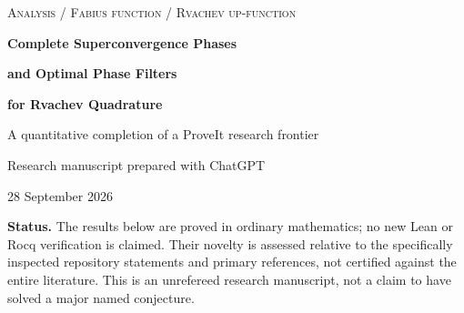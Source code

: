 \documentclass[11pt,a4paper]{article}
\numberwithin{equation}{section}
\theoremstyle{plain}
\theoremstyle{definition}
\theoremstyle{remark}
\begin{document}
\hypersetup{pageanchor=false}
\begin{titlepage}
\centering
\vspace*{12mm}
{\small\scshape Analysis / Fabius function / Rvachev up-function\par}
\vspace{13mm}
{\LARGE\bfseries Complete Superconvergence Phases\par}
\vspace{3mm}
{\LARGE\bfseries and Optimal Phase Filters\par}
\vspace{3mm}
{\LARGE\bfseries for Rvachev Quadrature\par}
\vspace{9mm}
{\large A quantitative completion of a ProveIt research frontier\par}
\vspace{10mm}
{Research manuscript prepared with ChatGPT\par}
{28 September 2026\par}
\vspace{12mm}
\begin{minipage}{0.92\textwidth}
\begin{abstract}
The ProveIt Fabius-function project establishes polynomial quadrature
exactness at parity-selected lattice phases, while explicitly leaving open
whether other first-superconvergent phases exist. We prove that they do not.
For every positive integer mesh parameter $M$, write $d=\nu_2(M)$.
Exactly two phases modulo one integrate all polynomials through degree
$d+1$: $0,\tfrac12$ when $d$ is even, and $\tfrac14,\tfrac34$ when $d$ is odd.
The proof is quantitative. An odd-multiplier inequality for the Fourier
product makes the entire first defect a relative perturbation of one
harmonic by at most $\pi^2/8-1<0.234$, uniformly in the odd part of $M$.
We also classify every finite complex phase measure giving polynomial
exactness uniformly under translation. At a reduced rational mesh $a/b$,
exactness through degree $r$ is equivalent to invariance under translation
by $1/(b2^{\max(0,r-\nu_2(a))})$. At an irrational mesh, even uniform
constant exactness forces Haar measure. The classification gives sharp
phase-count bounds, unique minimum-size filters up to translation, a finite
Fourier-moment recognition theorem, and corresponding results for
moment-deconvolved polynomial synthesis. Complete analytic proofs, exact
sample checks, and a further-research program are included.
\end{abstract}
\end{minipage}
\vfill
\begin{minipage}{0.92\textwidth}
\small
\textbf{Status.} The results below are proved in ordinary mathematics; no new
Lean or Rocq verification is claimed. Their novelty is assessed relative to
the specifically inspected repository statements and primary references,
not certified against the entire literature. This is an unrefereed research
manuscript, not a claim to have solved a major named conjecture.
\end{minipage}
\end{titlepage}
\end{document}
